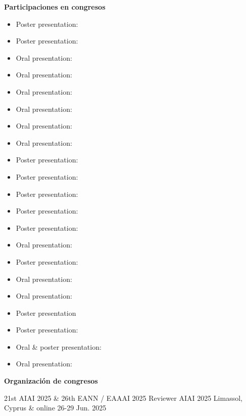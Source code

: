 \textbf{Participaciones en congresos}
% 
\begin{itemize}
 \item Poster presentation:  %
 \item Poster presentation:  %
 \item Oral presentation:  %
 \item Oral presentation:  %
 \item Oral presentation: 
 \item Oral presentation: 
 \item Oral presentation: 
 \item Oral presentation: 
 \item Poster presentation:  
 \item Poster presentation:  
 \item Poster presentation: 
 \item Poster presentation: 
 \item Poster presentation: 
 \item Oral presentation:  
 \item Poster presentation: 
 \item Oral presentation: 
 \item Oral presentation:  
 \item Poster presentation
 \item Poster presentation: 
 \item Oral \& poster presentation: 
 \item Oral presentation: 
\end{itemize}

\textbf{Organización de congresos}
\begin{cventries}
	\cventry
    {21st AIAI 2025 \& 26th EANN / EAAAI 2025}
    {Reviewer AIAI 2025}
    {Limassol, Cyprus \& online}
    {26-29 Jun. 2025}
    {
    }
\end{cventries}

